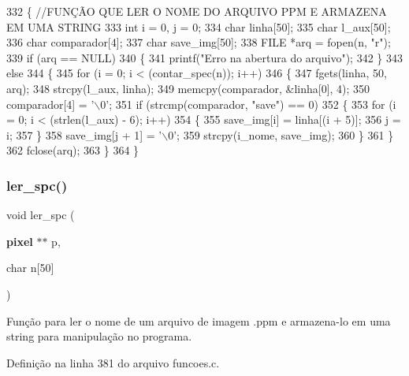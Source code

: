 \begin{DoxyCode}
332 \{ \textcolor{comment}{//FUNÇÃO QUE LER O NOME DO ARQUIVO PPM E ARMAZENA EM UMA STRING}
333     \textcolor{keywordtype}{int} i = 0, j = 0;
334     \textcolor{keywordtype}{char} linha[50];
335     \textcolor{keywordtype}{char} l\_aux[50];
336     \textcolor{keywordtype}{char} comparador[4];
337     \textcolor{keywordtype}{char} save\_img[50];
338     FILE *arq = fopen(n, \textcolor{stringliteral}{"r"});
339     \textcolor{keywordflow}{if} (arq == NULL)
340     \{
341         printf(\textcolor{stringliteral}{"Erro na abertura do arquivo"});
342     \}
343     \textcolor{keywordflow}{else}
344     \{
345         \textcolor{keywordflow}{for} (i = 0; i < (contar_spec(n)); i++)
346         \{
347             fgets(linha, 50, arq);
348             strcpy(l\_aux, linha);
349             memcpy(comparador, &linha[0], 4);
350             comparador[4] = \textcolor{charliteral}{'\(\backslash\)0'};
351             \textcolor{keywordflow}{if} (strcmp(comparador, \textcolor{stringliteral}{"save"}) == 0)
352             \{
353                 \textcolor{keywordflow}{for} (i = 0; i < (strlen(l\_aux) - 6); i++)
354                 \{
355                     save\_img[i] = linha[(i + 5)];
356                     j = i;
357                 \}
358                 save\_img[j + 1] = \textcolor{charliteral}{'\(\backslash\)0'};
359                 strcpy(i\_nome, save\_img);
360             \}
361         \}
362         fclose(arq);
363     \}
364 \}
\end{DoxyCode}
\mbox{\label{funcoes_8c_ab13215ddb866fcdf16ecefbabffaf0a5}} 
\subsubsection{ler\+\_\+spc()}
{\footnotesize\ttfamily void ler\+\_\+spc (\begin{DoxyParamCaption}\item[{\textbf{ pixel} $\ast$$\ast$}]{p,  }\item[{char}]{n[50] }\end{DoxyParamCaption})}



Função para ler o nome de um arquivo de imagem .ppm e armazena-\/lo em uma string para manipulação no programa. 



Definição na linha 381 do arquivo funcoes.\+c.


